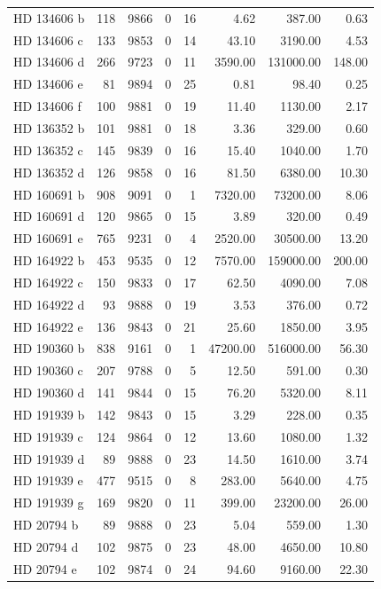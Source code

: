 \begin{table}
\begin{tabular}{lrrrrrrr}
HD 134606 b & 118 & 9866 & 0 & 16 & 4.62 & 387.00 & 0.63 \\
HD 134606 c & 133 & 9853 & 0 & 14 & 43.10 & 3190.00 & 4.53 \\
HD 134606 d & 266 & 9723 & 0 & 11 & 3590.00 & 131000.00 & 148.00 \\
HD 134606 e & 81 & 9894 & 0 & 25 & 0.81 & 98.40 & 0.25 \\
HD 134606 f & 100 & 9881 & 0 & 19 & 11.40 & 1130.00 & 2.17 \\
HD 136352 b & 101 & 9881 & 0 & 18 & 3.36 & 329.00 & 0.60 \\
HD 136352 c & 145 & 9839 & 0 & 16 & 15.40 & 1040.00 & 1.70 \\
HD 136352 d & 126 & 9858 & 0 & 16 & 81.50 & 6380.00 & 10.30 \\
HD 160691 b & 908 & 9091 & 0 & 1 & 7320.00 & 73200.00 & 8.06 \\
HD 160691 d & 120 & 9865 & 0 & 15 & 3.89 & 320.00 & 0.49 \\
HD 160691 e & 765 & 9231 & 0 & 4 & 2520.00 & 30500.00 & 13.20 \\
HD 164922 b & 453 & 9535 & 0 & 12 & 7570.00 & 159000.00 & 200.00 \\
HD 164922 c & 150 & 9833 & 0 & 17 & 62.50 & 4090.00 & 7.08 \\
HD 164922 d & 93 & 9888 & 0 & 19 & 3.53 & 376.00 & 0.72 \\
HD 164922 e & 136 & 9843 & 0 & 21 & 25.60 & 1850.00 & 3.95 \\
HD 190360 b & 838 & 9161 & 0 & 1 & 47200.00 & 516000.00 & 56.30 \\
HD 190360 c & 207 & 9788 & 0 & 5 & 12.50 & 591.00 & 0.30 \\
HD 190360 d & 141 & 9844 & 0 & 15 & 76.20 & 5320.00 & 8.11 \\
HD 191939 b & 142 & 9843 & 0 & 15 & 3.29 & 228.00 & 0.35 \\
HD 191939 c & 124 & 9864 & 0 & 12 & 13.60 & 1080.00 & 1.32 \\
HD 191939 d & 89 & 9888 & 0 & 23 & 14.50 & 1610.00 & 3.74 \\
HD 191939 e & 477 & 9515 & 0 & 8 & 283.00 & 5640.00 & 4.75 \\
HD 191939 g & 169 & 9820 & 0 & 11 & 399.00 & 23200.00 & 26.00 \\
HD 20794 b & 89 & 9888 & 0 & 23 & 5.04 & 559.00 & 1.30 \\
HD 20794 d & 102 & 9875 & 0 & 23 & 48.00 & 4650.00 & 10.80 \\
HD 20794 e & 102 & 9874 & 0 & 24 & 94.60 & 9160.00 & 22.30 \\

\end{tabular}
\end{table}
